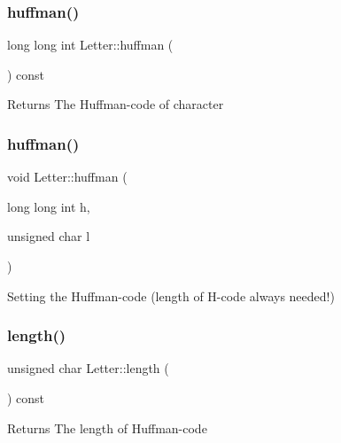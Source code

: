 \subsubsection{\texorpdfstring{huffman()}{huffman()}\hspace{0.1cm}{\footnotesize\ttfamily [1/2]}}
{\footnotesize\ttfamily long long int Letter\+::huffman (\begin{DoxyParamCaption}{ }\end{DoxyParamCaption}) const\hspace{0.3cm}{\ttfamily [inline]}}

\begin{DoxyReturn}{Returns}
The Huffman-\/code of character 
\end{DoxyReturn}
\mbox{\label{class_letter_ac345d7df6c98a9aea64f77d55267f820}} 
\subsubsection{\texorpdfstring{huffman()}{huffman()}\hspace{0.1cm}{\footnotesize\ttfamily [2/2]}}
{\footnotesize\ttfamily void Letter\+::huffman (\begin{DoxyParamCaption}\item[{long long int}]{h,  }\item[{unsigned char}]{l }\end{DoxyParamCaption})\hspace{0.3cm}{\ttfamily [inline]}}

Setting the Huffman-\/code (length of H-\/code always needed!) \mbox{\label{class_letter_a06c63721ba0b1c40ac7591835f2e6e43}} 
\subsubsection{\texorpdfstring{length()}{length()}}
{\footnotesize\ttfamily unsigned char Letter\+::length (\begin{DoxyParamCaption}{ }\end{DoxyParamCaption}) const\hspace{0.3cm}{\ttfamily [inline]}}

\begin{DoxyReturn}{Returns}
The length of Huffman-\/code 
\end{DoxyReturn}
\mbox{\label{class_letter_a9da69c0371f32304bbbe5c9b97160eef}} 
